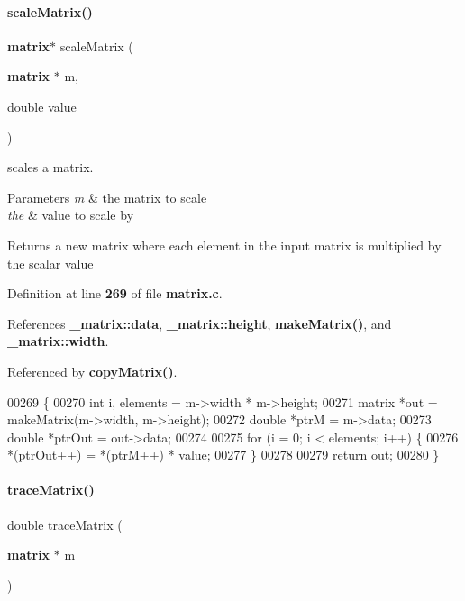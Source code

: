 \paragraph{scale\+Matrix()}
{\footnotesize\ttfamily \textbf{ matrix}$\ast$ scale\+Matrix (\begin{DoxyParamCaption}\item[{\textbf{ matrix} $\ast$}]{m,  }\item[{double}]{value }\end{DoxyParamCaption})}



scales a matrix. 


\begin{DoxyParams}{Parameters}
{\em m} & the matrix to scale \\
\hline
{\em the} & value to scale by \\
\hline
\end{DoxyParams}
\begin{DoxyReturn}{Returns}
a new matrix where each element in the input matrix is multiplied by the scalar value 
\end{DoxyReturn}


Definition at line \textbf{ 269} of file \textbf{ matrix.\+c}.



References \textbf{ \+\_\+matrix\+::data}, \textbf{ \+\_\+matrix\+::height}, \textbf{ make\+Matrix()}, and \textbf{ \+\_\+matrix\+::width}.



Referenced by \textbf{ copy\+Matrix()}.


\begin{DoxyCode}
00269                                              \{
00270   \textcolor{keywordtype}{int} i, elements = m->width * m->height;
00271   matrix *out = makeMatrix(m->width, m->height);
00272   \textcolor{keywordtype}{double} *ptrM = m->data;
00273   \textcolor{keywordtype}{double} *ptrOut = out->data;
00274 
00275   \textcolor{keywordflow}{for} (i = 0; i < elements; i++) \{
00276     *(ptrOut++) = *(ptrM++) * value;
00277   \}
00278 
00279   \textcolor{keywordflow}{return} out;
00280 \}
\end{DoxyCode}
\mbox{\label{a00125_a4794df8b2032f961dd8b2d90276bc417}} 
\paragraph{trace\+Matrix()}
{\footnotesize\ttfamily double trace\+Matrix (\begin{DoxyParamCaption}\item[{\textbf{ matrix} $\ast$}]{m }\end{DoxyParamCaption})}



